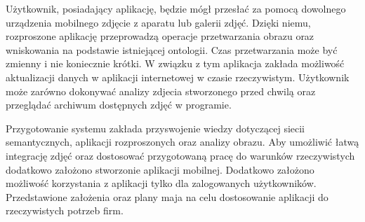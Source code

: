 Użytkownik, posiadający aplikację, będzie mógł przesłać za pomocą dowolnego urządzenia mobilnego zdjęcie z aparatu lub galerii zdjęć. Dzięki niemu, rozproszone aplikację przeprowadzą operacje przetwarzania obrazu oraz wniskowania na podstawie istniejącej ontologii. Czas przetwarzania może być zmienny i nie koniecznie krótki. W związku z tym aplikacja zakłada możliwość aktualizacji danych w aplikacji internetowej w czasie rzeczywistym. Użytkownik może zarówno dokonywać analizy zdjecia stworzonego przed chwilą oraz przeglądać archiwum dostępnych zdjęć w programie.

Przygotowanie systemu zakłada przyswojenie wiedzy dotyczącej siecii semantycznych, aplikacji rozproszonych oraz analizy obrazu. Aby umożliwić łatwą integrację zdjęć oraz dostosować przygotowaną pracę do warunków rzeczywistych dodatkowo założono stworzonie aplikacji mobilnej. Dodatkowo założono możliwość korzystania z aplikacji tylko dla zalogowanych użytkowników. Przedstawione założenia oraz plany maja na celu dostosowanie aplikacji do rzeczywistych potrzeb firm.
